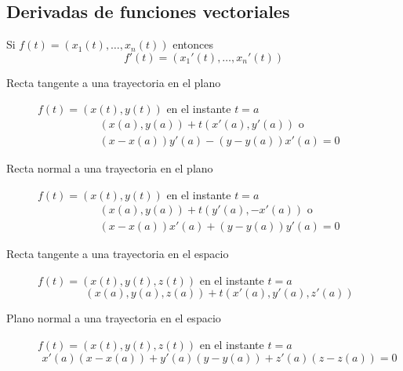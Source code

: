 \begin{multicols}{2}
\subsection*{Derivadas de funciones vectoriales}

	\begin{tcolorbox}[hbox, title=Derivada de una función vectorial]
		\begin{minipage}{0.4\textwidth}
			\flushleft
			Si $f(t)=(x_1(t),\ldots, x_n(t))$ entonces
			\[
				f'(t)=(x_1'(t),\ldots, x_n'(t))
			\]
		\end{minipage}
	\end{tcolorbox}

	\begin{tcolorbox}[hbox, title=Rectas tangente y normal en el plano]
		\begin{minipage}{0.4\textwidth}
			\flushleft
			\begin{description}
				\item[Recta tangente a una trayectoria en el plano] \mbox{$f(t)=(x(t),y(t))$} en el instante $t=a$				      
				\[
					\begin{array}{c}
						(x(a),y(a))+t(x'(a),y'(a)) \mbox{ o } \\
						(x-x(a))y'(a)-(y-y(a))x'(a)=0
					\end{array}      
				\]
				\item[Recta normal a una trayectoria en el plano] \mbox{$f(t)=(x(t),y(t))$} en el instante $t=a$
				\[
					\begin{array}{c}
						(x(a),y(a))+t(y'(a),-x'(a)) \mbox{ o }\\
						(x-x(a))x'(a)+(y-y(a))y'(a)=0
					\end{array}      
				\]
			\end{description}
		\end{minipage}
	\end{tcolorbox}

	\begin{tcolorbox}[hbox, title=Recta tangente y plano normal en el espacio]
		\begin{minipage}{0.4\textwidth}
			\flushleft
			\begin{description}
				\item[Recta tangente a una trayectoria en el espacio] \mbox{$f(t)=(x(t),y(t),z(t))$} en el instante $t=a$
				      \[
					      (x(a),y(a),z(a))+t(x'(a),y'(a),z'(a))
				      \]
				\item[Plano normal a una trayectoria en el espacio] \mbox{$f(t)=(x(t),y(t),z(t))$} en el instante $t=a$
				      \[
					      x'(a)(x-x(a))+y'(a)(y-y(a))+z'(a)(z-z(a))=0
				      \]
			\end{description}
		\end{minipage}
	\end{tcolorbox}




\end{multicols}
